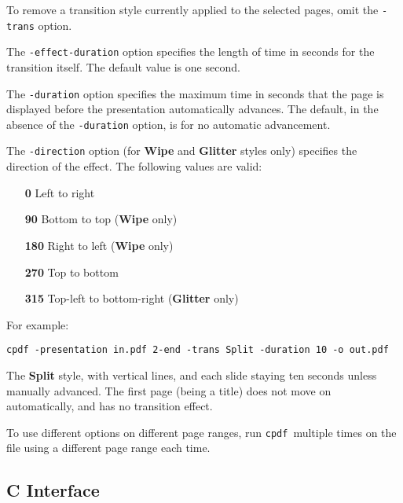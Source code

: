 \documentclass{book}
\newcommand{\cpdf}{\texttt{cpdf}}
\begin{document}
\noindent To remove a transition style currently applied to the selected pages,
omit the \texttt{-trans} option.

The \texttt{-effect-duration} option specifies the length of time in seconds
for the transition itself. The default value is one second.

The \texttt{-duration} option specifies the maximum time in seconds that the
page is displayed before the presentation automatically advances. The default,
in the absence of the \texttt{-duration} option, is for no automatic
advancement.

The \texttt{-direction} option (for \textbf{Wipe} and \textbf{Glitter} styles
only) specifies the direction of the effect. The following values are valid:
\begin{itemize}
  \item[\textbf{0}] Left to right
  \item[\textbf{90}] Bottom to top (\textbf{Wipe} only)
  \item[\textbf{180}] Right to left (\textbf{Wipe} only)
  \item[\textbf{270}] Top to bottom
  \item[\textbf{315}] Top-left to bottom-right (\textbf{Glitter} only)
\end{itemize}

\noindent For example:
\begin{framed}
  \small
  \noindent\verb!cpdf -presentation in.pdf 2-end -trans Split -duration 10 -o out.pdf!

  \vspace{2.5mm}
  The \textbf{Split} style, with vertical lines, and each slide staying ten
seconds unless manually advanced. The first page (being a title) does not move
on automatically, and has no transition effect.

\end{framed}

\noindent To use different options on different page ranges, run \cpdf\ multiple times on
the file using a different page range each time.

\begin{cpdflib}
\clearpage
\section*{C Interface}
\begin{small}\tt

\end{small}
\end{cpdflib}
\end{document}
